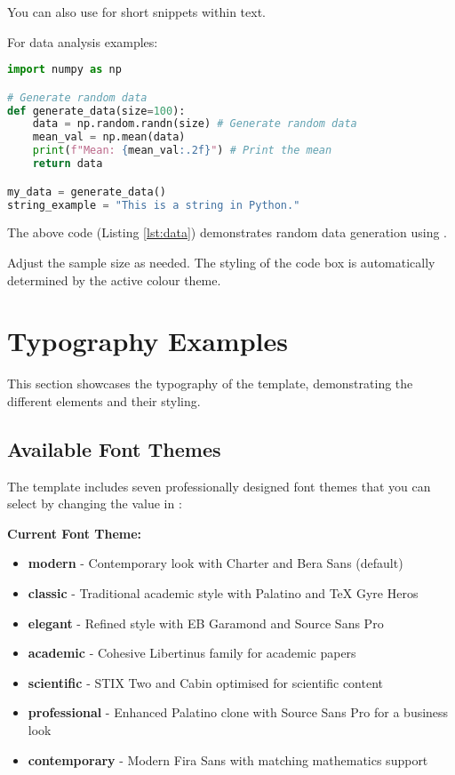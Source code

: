 \documentclass[a4paper,11pt]{article}
\begin{document}
You can also use  for short snippets within text.

For data analysis examples:

\begin{lstlisting}[language=Python, caption={Python script for data generation}, label={lst:data}]
import numpy as np

# Generate random data
def generate_data(size=100):
    data = np.random.randn(size) # Generate random data
    mean_val = np.mean(data)
    print(f"Mean: {mean_val:.2f}") # Print the mean
    return data

my_data = generate_data()
string_example = "This is a string in Python."
\end{lstlisting}

\begin{exampletbox}
    The above code (Listing \ref{lst:data}) demonstrates random data generation using .

    Adjust the sample size as needed. The styling of the code box is automatically determined by the active colour theme.
\end{exampletbox}

\section{Typography Examples}

This section showcases the typography of the template, demonstrating the different elements and their styling.

\subsection{Available Font Themes}

The template includes seven professionally designed font themes that you can select by changing the \inlinecode{\\fonttheme} value in :

\begin{center}
\large\textbf{Current Font Theme: \textcolor{accentcolor}{\fonttheme}}
\end{center}

\begin{itemize}
    \item \textbf{modern} - Contemporary look with Charter and Bera Sans (default)
    \item \textbf{classic} - Traditional academic style with Palatino and TeX Gyre Heros
    \item \textbf{elegant} - Refined style with EB Garamond and Source Sans Pro
    \item \textbf{academic} - Cohesive Libertinus family for academic papers
    \item \textbf{scientific} - STIX Two and Cabin optimised for scientific content
    \item \textbf{professional} - Enhanced Palatino clone with Source Sans Pro for a business look
    \item \textbf{contemporary} - Modern Fira Sans with matching mathematics support
\end{itemize}
\end{document}
